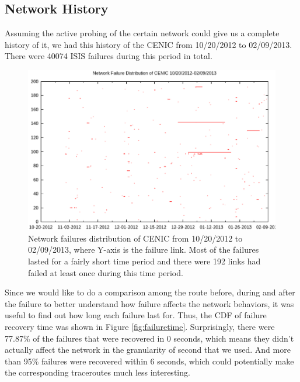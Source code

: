 \documentclass[conference, twocolumn, oneside, 10pt]{IEEEtran}
\begin{document}
\subsection{Network History}

Assuming the active probing of the certain network could give us a complete history of it, we had this history of the CENIC from 10/20/2012 to 02/09/2013. There were 40074 ISIS failures during this period in total.

\begin{figure}[h!]
\centering
\includegraphics[scale=0.4]{plot/failure_plot.eps}
\caption{Network failures distribution of CENIC from 10/20/2012 to 02/09/2013, where Y-axis is the failure link. Most of the failures lasted for a fairly short time period and there were 192 links had failed at least once during this time period.}
\label{fig:failureplot}
\end{figure}

Since we would like to do a comparison among the route before, during and after the failure to better understand how failure affects the network behaviors, it was useful to find out how long each failure last for. Thus, the CDF of failure recovery time was shown in Figure \ref{fig:failuretime}. Surprisingly, there were 77.87\% of the failures that were recovered in 0 seconds, which means they didn't actually affect the network in the granularity of second that we used. And more than 95\% failures were recovered within 6 seconds, which could potentially make the corresponding traceroutes much less interesting. 
\end{document}
